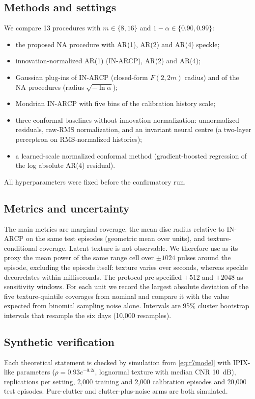 \subsection{Methods and settings}
We compare 13 procedures with $m\in\{8,16\}$ and $1-\alpha\in\{0.90,0.99\}$:
\begin{itemize}[leftmargin=*,itemsep=1pt]
\item the proposed NA procedure with AR(1), AR(2) and AR(4) speckle;
\item innovation-normalized AR(1) (IN-ARCP), AR(2) and AR(4);
\item Gaussian plug-ins of IN-ARCP (closed-form $F(2,2m)$ radius) and of the NA procedures (radius $\sqrt{-\ln\alpha}$);
\item Mondrian IN-ARCP with five bins of the calibration history scale;
\item three conformal baselines without innovation normalization: unnormalized residuals, raw-RMS normalization, and an invariant neural centre (a two-layer perceptron on RMS-normalized histories);
\item a learned-scale normalized conformal method (gradient-boosted regression of the log absolute AR(4) residual).
\end{itemize}
All hyperparameters were fixed before the confirmatory run.

\subsection{Metrics and uncertainty}
The main metrics are marginal coverage, the mean disc radius relative to IN-ARCP on the same test episodes (geometric mean over units), and texture-conditional coverage. Latent texture is not observable. We therefore use as its proxy the mean power of the same range cell over $\pm1024$ pulses around the episode, excluding the episode itself: texture varies over seconds, whereas speckle decorrelates within milliseconds. The protocol pre-specified $\pm512$ and $\pm2048$ as sensitivity windows. For each unit we record the largest absolute deviation of the five texture-quintile coverages from nominal and compare it with the value expected from binomial sampling noise alone. Intervals are 95\% cluster bootstrap intervals that resample the six days (10,000 resamples).

\subsection{Synthetic verification}
Each theoretical statement is checked by simulation from \eqref{eq:r7model} with IPIX-like parameters ($\rho=0.93e^{-0.2i}$, lognormal texture with median CNR 10~dB), \SynReps{} replications per setting, 2,000 training and 2,000 calibration episodes and 20,000 test episodes. Pure-clutter and clutter-plus-noise arms are both simulated.

